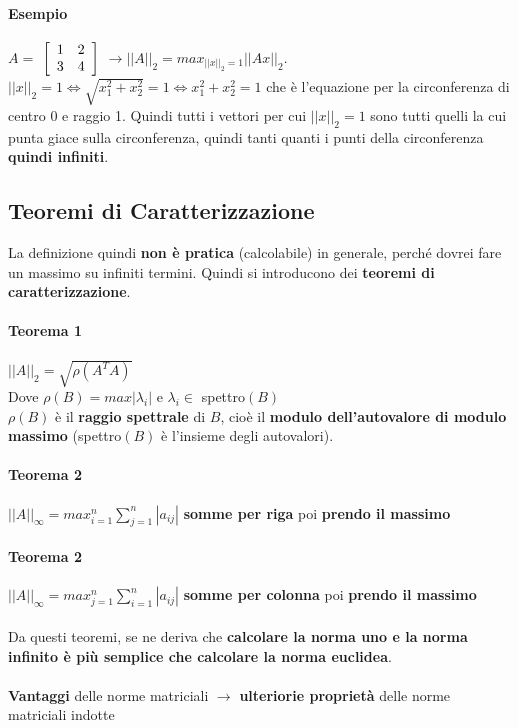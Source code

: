 \documentclass[10pt]{book}
\begin{document}
\paragraph{Esempio} $A = $
	\begin{math}
		\left[
		\begin{array}{c c}
			1 & 2\\
			3 & 4
		\end{array}
		\right]
	\end{math}
$\rightarrow ||A||_2 = max_{||x||_2 = 1} ||Ax||_2$.\\
$||x||_2 = 1 \Leftrightarrow \sqrt{x_1^2 + x_2^2} = 1 \Leftrightarrow x_1^2 + x_2^2 = 1$ che è l'equazione per la circonferenza di centro 0 e raggio 1. Quindi tutti i vettori per cui $||x||_2 = 1$ sono tutti quelli la cui punta giace sulla circonferenza, quindi tanti quanti i punti della circonferenza \textbf{quindi infiniti}.
\subsection{Teoremi di Caratterizzazione}
La definizione quindi \textbf{non è pratica} (calcolabile) in generale, perché dovrei fare un massimo su infiniti termini. Quindi si introducono dei \textbf{teoremi di caratterizzazione}.
\paragraph{Teorema 1} $||A||_2 = \sqrt{\rho (A^TA)}$\\Dove $\rho(B) = max |\lambda_i|$ e $\lambda_i \in $ spettro$(B)$\\
$\rho(B)$ è il \textbf{raggio spettrale} di $B$, cioè il \textbf{modulo dell'autovalore di modulo massimo} (spettro$(B)$ è l'insieme degli autovalori).
\paragraph{Teorema 2} $||A||_\infty = max_{i = 1}^n \sum_{j = 1}^n |a_{ij}|$ \textbf{somme per riga} poi \textbf{prendo il massimo}
\paragraph{Teorema 2} $||A||_\infty = max_{j = 1}^n \sum_{i = 1}^n |a_{ij}|$ \textbf{somme per colonna} poi \textbf{prendo il massimo}\\\\
Da questi teoremi, se ne deriva che \textbf{calcolare la norma uno e la norma infinito è più semplice che calcolare la norma euclidea}.\\\\
\textbf{Vantaggi} delle norme matriciali $\rightarrow$ \textbf{ulteriorie proprietà} delle norme matriciali indotte
\pagebreak
\end{document}

